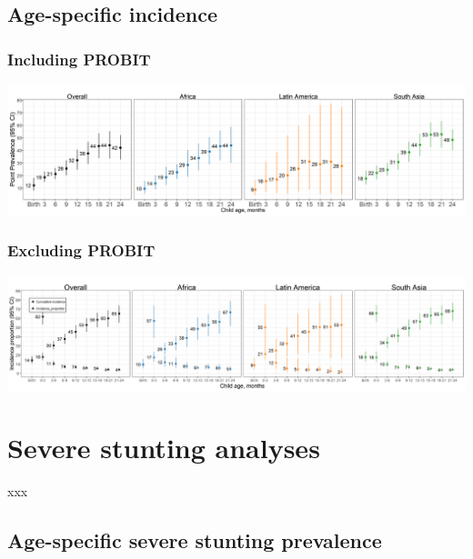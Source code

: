 \documentclass[9pt,]{book}
\begin{document}
\hypertarget{age-specific-incidence-1}{%
\section{Age-specific incidence}\label{age-specific-incidence-1}}

\hypertarget{including-probit-2}{%
\subsection{Including PROBIT}\label{including-probit-2}}

\includegraphics[width=58.33in]{figure-copies/fig-stunt-2-prev-overall_region--allage-primary}

\hypertarget{excluding-probit-2}{%
\subsection{Excluding PROBIT}\label{excluding-probit-2}}

\includegraphics[width=66.67in]{figure-copies/fig-stunt-2-inc-overall_region--allage-primary_no_probit}

\hypertarget{severe-stunting}{%
\chapter{Severe stunting analyses}\label{severe-stunting}}

\raggedright

xxx

\hypertarget{age-specific-severe-stunting-prevalence}{%
\section{Age-specific severe stunting prevalence}\label{age-specific-severe-stunting-prevalence}}
\end{document}
